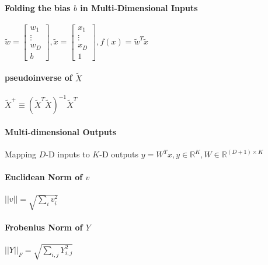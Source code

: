 \documentclass[12pt]{article}
\begin{document}
\paragraph{Folding the bias $b$ in Multi-Dimensional Inputs} $\tilde{w} = \begin{bmatrix}
   w_{1} \\
   \vdots \\
   w_{D}\\
   b
 \end{bmatrix}, \tilde{x} = \begin{bmatrix}
   x_{1} \\
   \vdots \\
   x_{D} \\
   1
 \end{bmatrix}, f(x) = \tilde{w}^T\tilde{x}$

\paragraph{pseudoinverse of $\tilde{X}$}{$\tilde{X}^+ \equiv (\tilde{X}^T \tilde{X})^{-1} \tilde{X}^T$}

\paragraph{Multi-dimensional Outputs}{Mapping $D$-D inputs to $K$-D outputs $y = W^T x, y\in\mathbb{R}^K, W \in\mathbb{R}^{(D+1) \times K}$}

\paragraph{Euclidean Norm of $v$}{$||v|| = \sqrt{\sum_i v_i^2}$}

\paragraph{Frobenius Norm of $Y$}{$||Y||_F = \sqrt{\sum_{i,j} Y^2_{i,j}}$}
\end{document}
